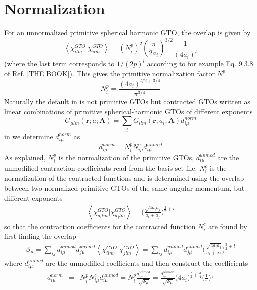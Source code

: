 \section{Normalization}

For an unnormalized primitive spherical harmonic GTO, the overlap is given by
\begin{equation}
\left\langle \chi^{GTO}_{i lm} | \chi^{GTO}_{i lm} \right\rangle = (N_i^{p})^2 \left(\frac{\pi}{2a_i}\right)^{3/2}\frac{1}{(4a_i)^l}
\end{equation}
(where the last term corresponds to $1/(2p)^l$ according to for example Eq. 9.3.8 of Ref. [THE BOOK]). This gives 
the primitive normalization factor $N^{p}$
\begin{equation}
  N^{p}_i = \frac{(4a_i)^{l/2+3/4}}{\pi^{3/4}}
\end{equation}
Naturally the default in {\lsdalton} is not primitive GTOs but contracted GTOs written as linear combinations of primitive spherical-harmonic GTOs of different exponents
\begin{equation}
G_{\mu lm}(\textbf{r}; a;\textbf{A}) = \sum_{i} G_{ilm}(\textbf{r}; a_{i};\textbf{A})d^{norm}_{i\mu}
\end{equation}
in {\lsdalton} we determine $d^{norm}_{i\mu}$ as
\begin{equation}
d^{norm}_{i\mu} = N^{p}_{i}N^{c}_{i\mu}d^{unmod}_{i\mu}
\end{equation}
As explained, $N^{p}_{i}$ is the normalization of the primitive GTOs, $d^{unmod}_{i\mu}$ are the 
unmodified contraction coefficients read from the basis set file. $N^{c}_{i}$ is the normalization of the contracted functions and is determined using the overlap between two normalized primitive GTOs of the same angular momentum, but different exponents
\begin{eqnarray}
\left\langle \chi^{GTO}_{a_{i}lm} | \chi^{GTO}_{a_{j}lm} \right\rangle = \biggl( \frac{\sqrt{ 4 a_{i} a_{j}}}{a_{i}+a_{j}} \biggr)^{\frac{3}{2}+l}
\end{eqnarray}
so that the contraction coefficients for the contracted function $N^{c}_{i}$ are found by first finding the overlap
\begin{eqnarray}
\mathcal{S}_{\mu} = \sum_{ij} d_{i\mu}^{unmod} d_{j\mu}^{unmod} \left\langle \chi^{GTO}_{ilm} | \chi^{GTO}_{jlm} \right\rangle = \sum_{ij} d_{i\mu}^{unmod} d_{j\mu}^{unmod} \biggl( \frac{\sqrt{ 4 a_{i} a_{j}}}{a_{i}+a_{j}} \biggr)^{\frac{3}{2}+l}
\end{eqnarray}
where $d_{i\mu}^{unmod}$ are the unmodified coefficients and then construct the coefficients
\begin{eqnarray}
d_{i\mu}^{norm} &=& N^{p}_{i}N^{c}_{i\mu}d^{unmod}_{i\mu} = N^{p}_{i}\frac{d^{unmod}_{i\mu}}{\sqrt{ \mathcal{S}_{\mu} }} = \frac{d_{i\mu}^{unmod}}{\sqrt{\mathcal{S}_{\mu}}} \biggl( 4 a_{i}\biggr)^{\frac{l}{2} + \frac{3}{4}} \biggl( \frac{1}{\pi} \biggr)^{\frac{3}{4}}\end{eqnarray}

